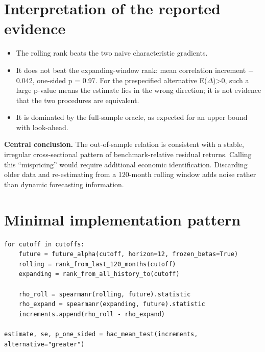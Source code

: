 \hypertarget{interpretation-of-the-reported-evidence}{%
\section{Interpretation of the reported
evidence}\label{interpretation-of-the-reported-evidence}}

\begin{itemize}
\tightlist
\item
  The rolling rank beats the two naive characteristic gradients.
\item
  It does not beat the expanding-window rank: mean correlation increment
  \ensuremath{-}0.042, one-sided p = 0.97. For the prespecified alternative
  E(\ensuremath{\Delta })\textgreater0, such a large p-value means the estimate lies in the
  wrong direction; it is not evidence that the two procedures are
  equivalent.
\item
  It is dominated by the full-sample oracle, as expected for an upper
  bound with look-ahead.
\end{itemize}

\textbf{Central conclusion.} The out-of-sample relation is consistent
with a stable, irregular cross-sectional pattern of benchmark-relative
residual returns. Calling this ``mispricing'' would require additional
economic identification. Discarding older data and re-estimating from a
120-month rolling window adds noise rather than dynamic forecasting
information.

\hypertarget{minimal-implementation-pattern}{%
\section{Minimal implementation
pattern}\label{minimal-implementation-pattern}}

\begin{verbatim}
for cutoff in cutoffs:
    future = future_alpha(cutoff, horizon=12, frozen_betas=True)
    rolling = rank_from_last_120_months(cutoff)
    expanding = rank_from_all_history_to(cutoff)

    rho_roll = spearmanr(rolling, future).statistic
    rho_expand = spearmanr(expanding, future).statistic
    increments.append(rho_roll - rho_expand)

estimate, se, p_one_sided = hac_mean_test(increments, alternative="greater")
\end{verbatim}

